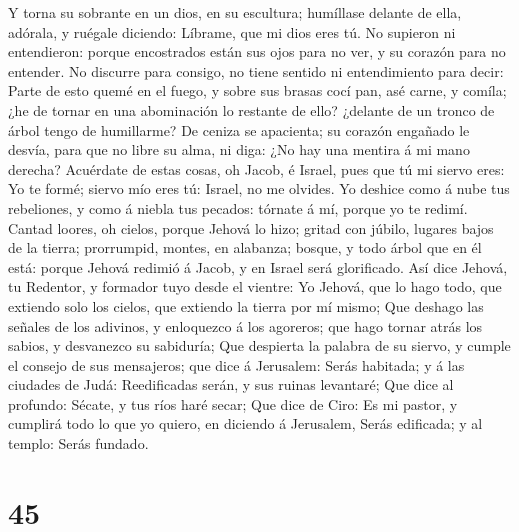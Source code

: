  Y torna su sobrante en un dios, en su escultura;
humíllase delante de ella, adórala, y ruégale diciendo: Líbrame, que mi
dios eres tú.  No supieron ni entendieron: porque
encostrados están sus ojos para no ver, y su corazón para no entender.
 No discurre para consigo, no tiene sentido ni
entendimiento para decir: Parte de esto quemé en el fuego, y sobre sus
brasas cocí pan, asé carne, y comíla; ¿he de tornar en una abominación
lo restante de ello? ¿delante de un tronco de árbol tengo de humillarme?
 De ceniza se apacienta; su corazón engañado le desvía,
para que no libre su alma, ni diga: ¿No hay una mentira á mi mano
derecha?  Acuérdate de estas cosas, oh Jacob, é Israel,
pues que tú mi siervo eres: Yo te formé; siervo mío eres tú: Israel, no
me olvides.  Yo deshice como á nube tus rebeliones, y
como á niebla tus pecados: tórnate á mí, porque yo te redimí.
 Cantad loores, oh cielos, porque Jehová lo hizo; gritad
con júbilo, lugares bajos de la tierra; prorrumpid, montes, en alabanza;
bosque, y todo árbol que en él está: porque Jehová redimió á Jacob, y en
Israel será glorificado.  Así dice Jehová, tu Redentor, y
formador tuyo desde el vientre: Yo Jehová, que lo hago todo, que
extiendo solo los cielos, que extiendo la tierra por mí mismo;
 Que deshago las señales de los adivinos, y enloquezco á
los agoreros; que hago tornar atrás los sabios, y desvanezco su
sabiduría;  Que despierta la palabra de su siervo, y
cumple el consejo de sus mensajeros; que dice á Jerusalem: Serás
habitada; y á las ciudades de Judá: Reedificadas serán, y sus ruinas
levantaré;  Que dice al profundo: Sécate, y tus ríos haré
secar;  Que dice de Ciro: Es mi pastor, y cumplirá todo
lo que yo quiero, en diciendo á Jerusalem, Serás edificada; y al templo:
Serás fundado.

\hypertarget{section-44}{%
\section{45}\label{section-44}}


